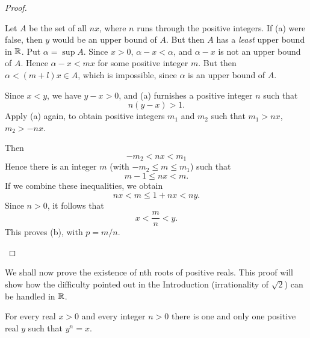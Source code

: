 \begin{proof}
    \begin{asparaenum}[(a)]
        \item Let $A$ be the set of all $nx$, 
        where $n$ runs through the positive integers.
        If (a) were false, then $y$ would be an upper bound of $A$. 
        But then $A$ has a \emph{least} upper bound in ${\protect\mathbb R}$. 
        Put $\alpha = \sup A$. 
        Since $x > 0$, $\alpha - x < \alpha$, 
        and $\alpha - x$ is not an upper bound of $A$. 
        Hence $\alpha - x < mx$ for some positive integer $m$. 
        But then $\alpha < (m + l)x \in A$, 
        which is impossible, 
        since $\alpha$ is an upper bound of $A$.
        \item Since $x < y$, we have $y - x > $0, 
        and (a) furnishes a positive integer $n$ 
        such that
        \begin{equation*}
            n(y - x) > 1.
        \end{equation*}
        Apply (a) again, to obtain positive integers $m_1$ and $m_2$ 
        such that $m_1 > nx$, $m_2 > -nx$. 

        Then
        \begin{equation*}
            -m_2 < nx < m_1
        \end{equation*}
        Hence there is an integer $m$ (with $-m_2 \leq m \leq m_1$) 
        such that
        \begin{equation*}
            m - 1\leq n x < m.
        \end{equation*}
        If we combine these inequalities, we obtain
        \begin{equation*}
            nx < m \leq 1 + nx < ny.
        \end{equation*}
        Since $n > 0$, it follows that
        \begin{equation*}
            x < \frac{m}{n} < y.
        \end{equation*}
        This proves (b), with $p = m/n$.
    \end{asparaenum}
\end{proof}

We shall now prove the existence of nth roots of positive reals. 
This proof will show how the difficulty pointed out in the Introduction 
(irrationality of $\sqrt{2}$) can be handled in ${\protect\mathbb R}$.

\begin{thm}
    \label{thm:1.21}
    For every real $x > 0$ and every integer $n> 0$ 
    there is one and only one positive real $y$ 
    such that $y^n = x$.
\end{thm}

